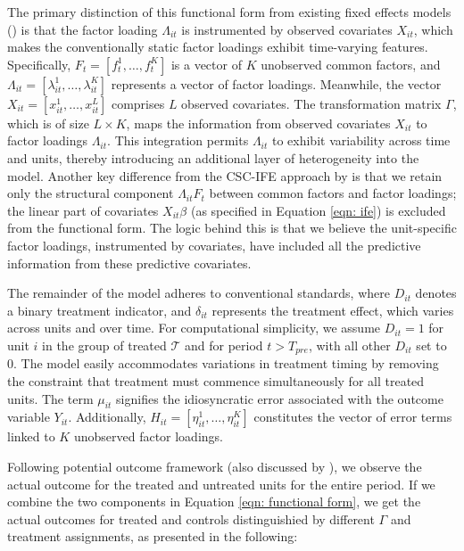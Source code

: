 \documentclass[12pt]{article}
\begin{document}
The primary distinction of this functional form from existing fixed effects models (\cite{gobillon2016regional, chan2016policy}) is that the factor loading $\Lambda_{it}$ is instrumented by observed covariates $X_{it}$, which makes the conventionally static factor loadings exhibit time-varying features. Specifically, $F_t = [f_t^1, \ldots, f_t^K]$ is a vector of $K$ unobserved common factors, and $\Lambda_{it} = [\lambda_{it}^1, \ldots, \lambda_{it}^K]$ represents a vector of factor loadings. Meanwhile, the vector $X_{it} = [x_{it}^1, \ldots, x_{it}^L]$ comprises $L$ observed covariates. The transformation matrix $\Gamma$, which is of size $L \times K$, maps the information from observed covariates $X_{it}$ to factor loadings $\Lambda_{it}$. This integration permits $\Lambda_{it}$ to exhibit variability across time and units, thereby introducing an additional layer of heterogeneity into the model. Another key difference from the CSC-IFE approach by \cite{xu2017generalized} is that we retain only the structural component $\Lambda_{it} F_t$ between common factors and factor loadings; the linear part of covariates $X_{it}\beta$ (as specified in Equation \ref{eqn: ife}) is excluded from the functional form. The logic behind this is that we believe the unit-specific factor loadings, instrumented by covariates, have included all the predictive information from these predictive covariates.

The remainder of the model adheres to conventional standards, where $D_{it}$ denotes a binary treatment indicator, and $\delta_{it}$ represents the treatment effect, which varies across units and over time. For computational simplicity, we assume $D_{it} = 1$ for unit $i$ in the group of treated $\mathcal{T}$ and for period $t > T_{pre}$, with all other $D_{it}$ set to $0$. The model easily accommodates variations in treatment timing by removing the constraint that treatment must commence simultaneously for all treated units. The term $\mu_{it}$ signifies the idiosyncratic error associated with the outcome variable $Y_{it}$. Additionally, $H_{it} = [\eta_{it}^1, \ldots, \eta_{it}^K]$ constitutes the vector of error terms linked to $K$ unobserved factor loadings.

Following \cite{splawa1990application} potential outcome framework (also discussed by \cite{rubin1974estimating, rubin2005causal}), we observe the actual outcome for the treated and untreated units for the entire period. If we combine the two components in Equation \ref{eqn: functional form}, we get the actual outcomes for treated and controls distinguishied by different $\Gamma$ and treatment assignments, as presented in the following:
\end{document}
